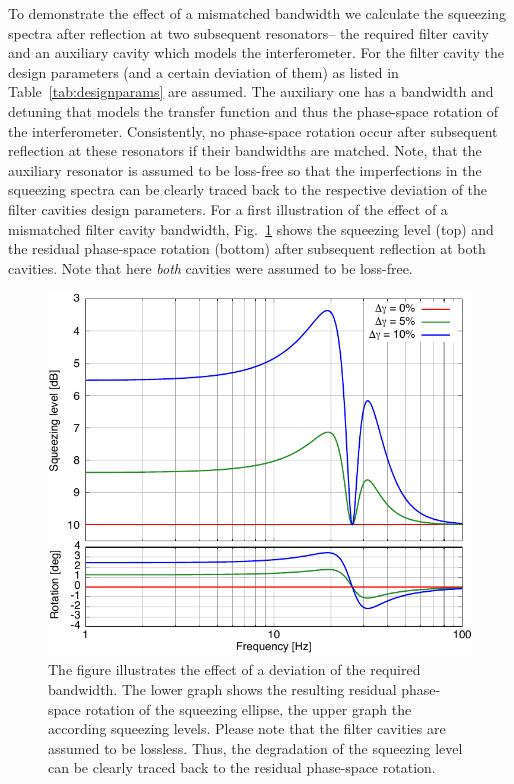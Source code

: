 To demonstrate the effect of a mismatched bandwidth we calculate the squeezing spectra after reflection at two subsequent resonators-- the required filter cavity and an auxiliary cavity which models the interferometer. For the filter cavity the design parameters (and a certain deviation of them) as listed in Table~\ref{tab:designparams} are assumed. The auxiliary one has a bandwidth and detuning  that models the transfer function and thus the phase-space rotation of the interferometer.  Consistently,  no phase-space rotation occur after subsequent reflection at these resonators if their bandwidths are matched.   Note, that  the auxiliary resonator is assumed to be loss-free so that the imperfections in the squeezing spectra can be clearly traced back to the respective deviation of the filter cavities design parameters. For a first illustration of the effect of a mismatched filter cavity bandwidth, Fig.~\ref{fig:devBWll} shows the squeezing level (top) and the residual phase-space rotation (bottom) after subsequent  reflection at both cavities. Note that here  \emph{both} cavities  were assumed to be loss-free.



\begin{figure}
\centering
\includegraphics{./Sec_Optics/FCs-devbw-10-20-rotAI.pdf}
\caption{The figure illustrates the effect of a deviation of the required bandwidth. The lower graph shows the resulting residual phase-space rotation of the squeezing ellipse, the upper graph the according squeezing levels. Please note that the filter cavities are assumed to be lossless. Thus, the degradation of the squeezing level can be clearly traced back to the residual phase-space rotation.}
\label{fig:devBWll}
\end{figure}

